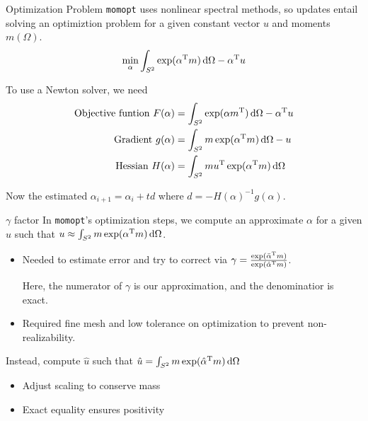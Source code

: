 \documentclass{beamer}
\renewcommand{\vec}[1]{\ensuremath{#1}}
\newcommand{\integral}[1]{\ensuremath{\int_{S^2} #1 \dif \Omega}}
\newcommand{\T}[1]{\ensuremath{#1^\textnormal{T}}}
\newcommand{\momopt}{\texttt{momopt}\xspace}
\begin{document}
    \begin{frame}{Optimization Problem}
        \momopt uses nonlinear spectral methods, so updates entail solving an optimiztion problem for a given constant vector \vec{u} and moments $\vec{m}(\Omega)$.
        \begin{equation*}
            \min_{\vec{\alpha}} \integral{\exp(\T{\vec{\alpha}} \vec{m})} - \T{\vec{\alpha}} \vec{u}
        \end{equation*}

        \vfill

        To use a Newton solver, we need
        \begin{align*}
            \textnormal{Objective funtion } F(\vec{\alpha}) &= \integral{\exp(\T{\vec{\alpha} \vec{m}})} - \T{\vec{\alpha}} \vec{u} \\
            \textnormal{Gradient } g(\vec{\alpha}) &= \integral{\vec{m} \exp(\vec{\T{\alpha}} \vec{m})} - \vec{u} \\
            \textnormal{Hessian } H(\vec{\alpha}) &= \integral{\vec{m} \T{\vec{u}} \exp(\T{\vec{\alpha}} \vec{m})}
        \end{align*}

        \vfill

        Now the estimated $\vec{\alpha}_{i+1} = \vec{\alpha}_i + t\vec{d}$ where $\vec{d} = -H(\vec{\alpha})^{-1}g(\vec{\alpha})$.
    \end{frame}

    \begin{frame}{$\gamma$ factor}
        In \momopt's optimization steps, we compute an approximate \vec{\alpha} for a given \vec{u} such that $\vec{u} \approx \integral{\vec{m} \exp (\T{\vec{\alpha}} \vec{m})}$.
        \begin{itemize}
            \item Needed to estimate error and try to correct via $\gamma = \frac{\exp(\T{\bar{\vec{\alpha}}} \vec{m})}{\exp(\T{\hat{\vec{\alpha}}} \vec{m})}$.

                Here, the numerator of $\gamma$ is our approximation, and the denominatior is exact.
            \item Required fine mesh and low tolerance on optimization to prevent non-realizability.
        \end{itemize}

        \vfill

        Instead, compute $\hat{\vec{u}}$ such that $\hat{\vec{u}} = \integral{\vec{m} \exp(\T{\hat{\vec{\alpha}}} \vec{m})}$
        \begin{itemize}
            \item Adjust scaling to conserve mass
            \item \alert{Exact equality ensures positivity}
        \end{itemize}
    \end{frame}
\end{document}
